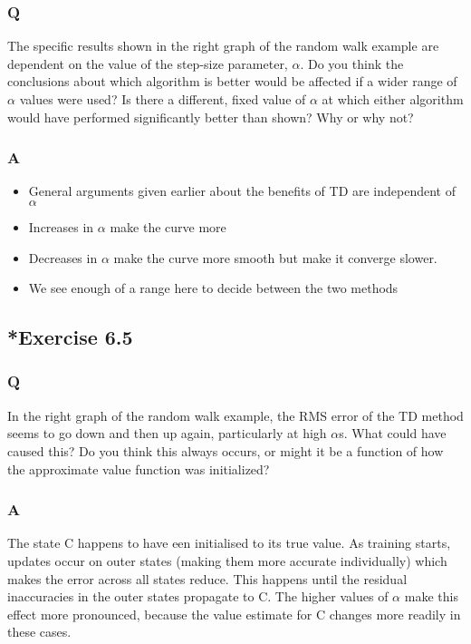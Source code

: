 \subsubsection*{Q}
The specific results shown in the right graph of the random walk example are dependent on the value of the step-size parameter, $\alpha$. Do you think the conclusions about which algorithm is better would be affected if a wider range of $\alpha$ values were used? Is there a different, fixed value of $\alpha$ at which either algorithm would have performed significantly better than shown? Why or why not?
\subsubsection*{A}

\begin{itemize}
    \item General arguments given earlier about the benefits of TD are independent of $\alpha$
    \item Increases in $\alpha$ make the curve more 
    \item Decreases in $\alpha$ make the curve more smooth but make it converge slower.
    \item We see enough of a range here to decide between the two methods
\end{itemize}

\subsection{*Exercise 6.5}
\subsubsection*{Q}
In the right graph of the random walk example, the RMS error of the TD method seems to go down and then up again, particularly at high $\alpha$s. What could have caused this? Do you think this always occurs, or might it be a function of how the approximate value function was initialized?
\subsubsection*{A}
The state C happens to have een initialised to its true value. As training starts, updates occur on outer states (making them more accurate individually) which makes the error across all states reduce. This happens until the residual inaccuracies in the outer states propagate to C. The higher values of $\alpha$ make this effect more pronounced, because the value estimate for C changes more readily in these cases.

